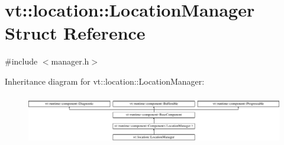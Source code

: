 \hypertarget{structvt_1_1location_1_1_location_manager}{}\section{vt\+:\+:location\+:\+:Location\+Manager Struct Reference}
\label{structvt_1_1location_1_1_location_manager}


{\ttfamily \#include $<$manager.\+h$>$}

Inheritance diagram for vt\+:\+:location\+:\+:Location\+Manager\+:\begin{figure}[H]
\begin{center}
\leavevmode
\includegraphics[height=2.222222cm]{structvt_1_1location_1_1_location_manager}
\end{center}
\end{figure}
